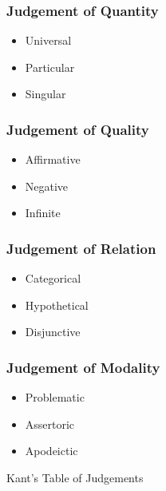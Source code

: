 \begin{figure}[H]
  \begin{multicols}{2}
    \subsubsection*{Judgement of Quantity}
    \begin{itemize}
      \item Universal
      \item Particular
      \item Singular
    \end{itemize}

    \subsubsection*{Judgement of Quality}
    \begin{itemize}
      \item Affirmative
      \item Negative
      \item Infinite
    \end{itemize}

    \columnbreak
    \subsubsection*{Judgement of Relation}
    \begin{itemize}
      \item Categorical
      \item Hypothetical
      \item Disjunctive
    \end{itemize}

    \subsubsection*{Judgement of Modality}
    \begin{itemize}
      \item Problematic
      \item Assertoric
      \item Apodeictic
    \end{itemize}
  \end{multicols}
  \caption{Kant's Table of Judgements}
  \label{judgements}
\end{figure}
